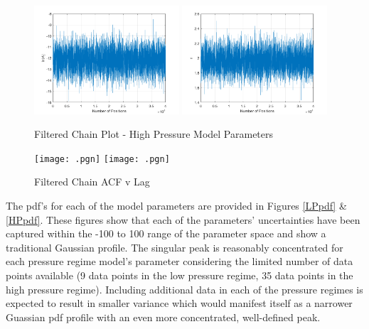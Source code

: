 \documentclass{article}
\begin{document}
\begin{figure}[htb]
\centering
\includegraphics[width=0.48\textwidth]{FilteredChain_lnA_HP.png}
\includegraphics[width=0.48\textwidth]{FilteredChain_n_HP.png}
\caption{Filtered Chain Plot - High Pressure Model Parameters}
\label{HPChain}
\end{figure}

\begin{figure}[htb]
\centering
\texttt{[image:    .pgn]}
\texttt{[image:    .pgn]}
\caption{Filtered Chain ACF v Lag}
\label{ACFplot}
\end{figure}

The pdf's for each of the model parameters are provided in Figures \ref{LPpdf} \& \ref{HPpdf}. These figures show that each of 
the parameters' uncertainties have been captured within the -100 to 100 range of the parameter space and show 
a traditional Gaussian profile. The singular peak is reasonably concentrated for each pressure regime model's 
parameter considering the limited number of data points available (9 data points in the low pressure regime, 
35 data points in the high pressure regime). Including additional data in each of the pressure regimes
is expected to result in smaller variance which would manifest itself as a narrower Guassian pdf profile with an even
more concentrated, well-defined peak.
\end{document}
